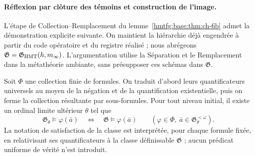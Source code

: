 \paragraph{Réflexion par clôture des témoins et construction de l'image.}
L’étape de Collection--Remplacement du lemme~\ref{hmtfg:base:thm:ch-6b} admet la
démonstration explicite suivante. On maintient la hiérarchie déjà engendrée à partir du
code opératoire et du registre réalisé ; nous abrégeons
\(\mathfrak G=\mathfrak G_{\rm HMT}(h,m_\infty)\).
L’argumentation utilise la Séparation et le Remplacement dans la métathéorie ambiante,
sans présupposer ces schémas dans \(\mathfrak G\).

Soit \(\Phi\) une collection finie de formules. On traduit d'abord leurs quantificateurs universels au moyen de la négation et de la quantification existentielle, puis on ferme la collection résultante par sous-formules. Pour tout niveau initial, il existe un ordinal limite ultérieur \(\theta\) tel que
\[
 \mathfrak G_\theta\models\varphi(\bar a)
 \quad\Longleftrightarrow\quad
 \mathfrak G\models\varphi(\bar a)
 \qquad
 (\varphi\in\Phi,\ \bar a\in\mathfrak G_\theta^{<\omega}).
\]
La notation de satisfaction de la classe est interprétée, pour chaque formule fixée, en relativisant ses quantificateurs à la classe définissable \(\mathfrak G\) ; aucun prédicat uniforme de vérité n'est introduit.

